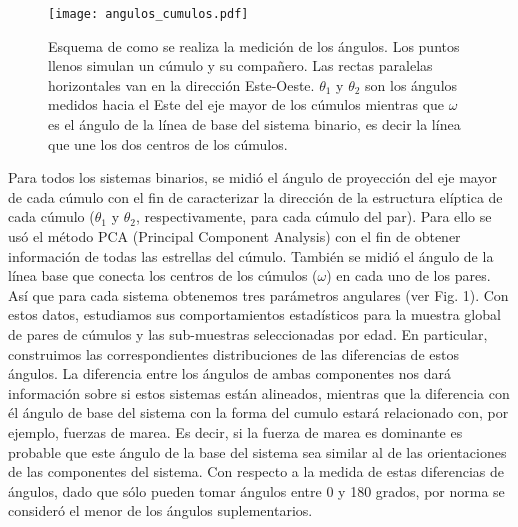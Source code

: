 \documentclass[baaa]{baaa}
\begin{document}
\begin{figure}[]
\centering
\texttt{[image: angulos\_cumulos.pdf]} 
\caption{Esquema de como se realiza la medición de los ángulos. Los puntos llenos simulan un cúmulo y su compañero.  Las rectas paralelas horizontales van en la dirección Este-Oeste.  $\theta_{1}$ y $\theta_{2}$ son los ángulos medidos hacia el Este del eje mayor de los cúmulos mientras que  $\omega$ es el ángulo de la línea de base del sistema binario, es decir la línea que une los dos centros de los cúmulos. }
\label{fig:bender}
\end{figure}

\noindent  Para todos los sistemas binarios, se midió el ángulo de proyección del eje mayor de cada cúmulo con el fin de caracterizar  la dirección de la estructura elíptica de cada cúmulo ($\theta_{1}$ y $\theta_{2}$, respectivamente, para cada cúmulo del par). Para ello se usó el método PCA (Principal Component  Analysis) con el fin de obtener información de todas las estrellas del cúmulo. También se midió  el ángulo de la línea base que conecta los centros de los cúmulos ($\omega$) en cada uno de los pares. Así que para cada sistema obtenemos tres parámetros angulares (ver Fig. 1). Con estos datos, estudiamos sus comportamientos estadísticos para la muestra global de pares de cúmulos y las sub-muestras seleccionadas por edad.  En particular, construimos las correspondientes distribuciones de las diferencias de estos ángulos.  La diferencia entre los ángulos de ambas componentes nos dará información sobre si estos sistemas están alineados, mientras que la diferencia con él ángulo de base del sistema con la forma del cumulo estará relacionado con, por ejemplo, fuerzas de marea. Es decir, si la fuerza de marea es dominante es probable que este ángulo de la base del sistema sea similar al  de las orientaciones de las componentes del sistema. Con respecto a la medida de estas diferencias de ángulos, dado que sólo pueden tomar ángulos entre 0 y 180 grados, por norma se consideró el menor de los ángulos suplementarios. 




\end{document}
